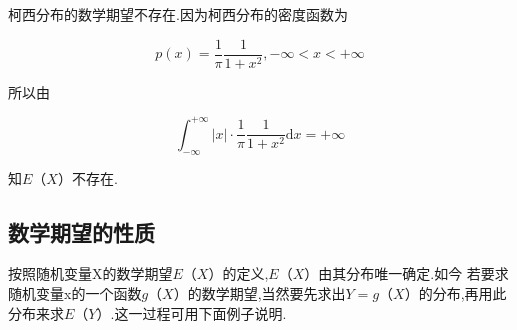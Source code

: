 \begin{example}
	柯西分布的数学期望不存在.因为柯西分布的密度函数为
	
	\[ 
	p(x)=\frac{1}{\pi} \frac{1}{1+x^{2}},-\infty<x<+\infty
	\]
	
	所以由
	
	\[ 
	\int_{-\infty}^{+\infty}|x| \cdot \frac{1}{\pi} \frac{1}{1+x^{2}} \mathrm{d} x=+\infty
	\]
	
	知$ E（X） $不存在.
	
\end{example}

\subsection{数学期望的性质}

按照随机变量X的数学期望$ E（X） $的定义,$ E（X） $由其分布唯一确定.如今
若要求随机变量x的一个函数$ g（X） $的数学期望,当然要先求出$ Y=g（X） $的分布,再用此分布来求$ E（Y ）$.这一过程可用下面例子说明.

